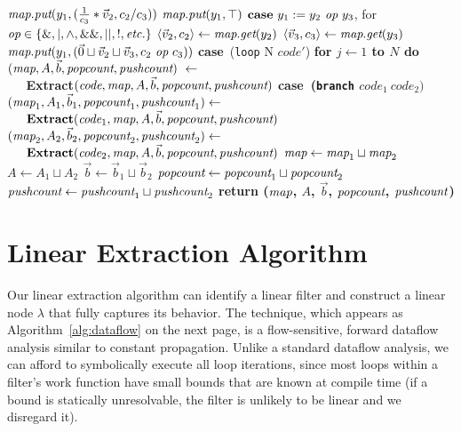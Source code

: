 \begin{algorithm}
\begin{algorithmic}
\IND
\STATE $\mbox{\it map}.\mbox{\it put}(y_1, (\frac{1}{c_3}*\vec v_2, c_2/c_3))$
\UND
{}
\IND
\STATE $\mbox{\it map}.\mbox{\it put}(y_1, \top)$
\UND
\UND
\STATE \vspace{-6pt}
\STATE $\mbox{\bf case}~y_1 := y_2 ~\mbox{\it op}~ y_3$, for $\mbox{\it op} \in \{\&, |, \wedge, \&\&, ||, !, \mbox{\it etc.}\}$
\IND
\STATE $\langle{\vec v_2}, {c_2}\rangle \leftarrow \mbox{\it map}.\mbox{\it get}(y_2)$
\STATE $\langle{\vec v_3}, {c_3}\rangle \leftarrow \mbox{\it map}.\mbox{\it get}(y_3)$
\STATE $\mbox{\it map}.\mbox{\it put}(y_1, (\vec 0 \sqcup \vec v_2 \sqcup \vec v_3, c_2 ~\mbox{\it op}~ c_3))$
\UND
\STATE \vspace{-6pt}
\STATE \mbox{\bf case}~({\tt loop} N $code'$)
\IND
\STATE \bf{for} $j \leftarrow 1$ to $N$ {\bf do}
\IND
\STATE $(\mbox{\it map}, A, {\vec b}, \mbox{\it popcount}, \mbox{\it pushcount})~\leftarrow~$ \\
\verb+   +\bf{Extract}$(\mbox{\it code}, \mbox{\it map}, A, {\vec b}, \mbox{\it popcount}, \mbox{\it pushcount})$
\UND
\UND
\STATE \vspace{-6pt}
\STATE \mbox{\bf case}~({\tt branch} $code_1~code_2)$
\IND
\STATE $(\mbox{\it map}_1, A_1, {\vec b_1}, \mbox{\it popcount}_1, \mbox{\it pushcount}_1) \leftarrow$ \\
\verb+   +${\mbox{\bf Extract}}(\mbox{\it code}_1, \mbox{\it map}, A, {\vec b}, \mbox{\it popcount}, \mbox{\it pushcount})$
\STATE $(\mbox{\it map}_2, A_2, {\vec b_2}, \mbox{\it popcount}_2, \mbox{\it pushcount}_2) \leftarrow$ \\ 
\verb+   +${\mbox{\bf Extract}}(\mbox{\it code}_2, \mbox{\it map}, A, {\vec b}, \mbox{\it popcount}, \mbox{\it pushcount})$
\STATE $\mbox{\it map} \leftarrow \mbox{\it map}_1 \sqcup \mbox{\it map}_2$
\STATE $A \leftarrow A_1 \sqcup A_2$
\STATE ${\vec b} \leftarrow {\vec b_1} \sqcup {\vec b_2}$
\STATE $\mbox{\it popcount} \leftarrow \mbox{\it popcount}_1 \sqcup \mbox{\it popcount}_2$
\STATE $\mbox{\it pushcount} \leftarrow \mbox{\it pushcount}_1 \sqcup \mbox{\it pushcount}_2$
\UND
\UND %
\ENDFOR
\STATE return ($\mbox{\it map}$, $A$, ${\vec b}$, $\mbox{\it popcount}$, $\mbox{\it pushcount}$)
\end{algorithmic}
\end{algorithm}

\section{Linear Extraction Algorithm}
\label{sec:dataflow}

Our linear extraction algorithm can identify a linear filter and
construct a linear node $\lambda$ that fully captures its behavior.
The technique, which appears as Algorithm~\ref{alg:dataflow} on the
next page, is a flow-sensitive, forward dataflow analysis similar to
constant propagation.  Unlike a standard dataflow analysis, we can
afford to symbolically execute all loop iterations, since most loops
within a filter's work function have small bounds that are known at
compile time (if a bound is statically unresolvable, the filter is
unlikely to be linear and we disregard it).

